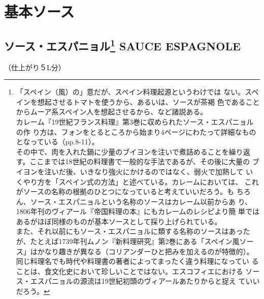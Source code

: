 \documentclass[twoside,12Q,b5paper]{escoffierltjsbook}
\date{}
\newenvironment{recette}{\begin{multicols}{2}}{\end{multicols}}
\renewcommand{\thechapter}{}
\renewcommand{\thesection}{}
\begin{document}





\section{基本ソース}\label{ux57faux672cux30bdux30fcux30b9}

\subsection[ソース・エスパニョル SAUCE
ESPAGNOLE]{\texorpdfstring{ソース・エスパニョル\footnote{「スペイン（風）の」意だが、スペイン料理起源というわけでは
  ない。スペインを想起させるトマトを使うから、あるいは、ソースが茶褐
  色であることからムーア系スペイン人を想起させるから、など諸説ある。\\
  カレーム『19世紀フランス料理』第3巻に収められたソース・エスパニョルの作
  り方は、フォンをとるところから始まり4ページにわたって詳細なものとなっている（pp.8-11）。\\
  その中で、肉を入れた鍋に少量のブイヨンを注いで煮詰めることを繰り返
  す。ここまでは18世紀の料理書で一般的な手法であるが、その後に大量の
  ブイヨンを注いだ後、いきなり強火にかけるのではなく、弱火で加熱して
  いくやり方を「スペイン式の方法」と述べている。カレームにおいては、
  これがソースの名称の根拠のひとつになっていると考えていいだろう。も
  ちろん、ソース・エスパニョルという名称のソースはカレーム以前からあ
  り、1806年刊のヴィアール『帝国料理の本』にもカレームのレシピより簡
  単ではあるがほぼ同様のものが基本ソースとして採り上げられている。\\
  また、それ以前にもソース・エスパニョルに類する名称のソースはあった
  が、たとえば1739年刊ムノン『新料理研究』第2巻にある「スペイン風ソー
  ス」はかなり趣きが異なる（コリアンダーひと把みを加えるのが特徴的）。
  同じ料理名でも時代や料理書の著者によってまったく違う料理になってい
  ることは、食文化史において珍しいことではない。エスコフィエにおける
  ソース・エスパニョルの源流は19世紀初頭のヴィアールあたりからと捉え
  ていいだろう。} SAUCE
ESPAGNOLE}{ソース・エスパニョル SAUCE ESPAGNOLE}}\label{ux30bdux30fcux30b9ux30a8ux30b9ux30d1ux30cbux30e7ux30eb102008-sauce-espagnole}

（仕上がり５L分）
\end{document}
